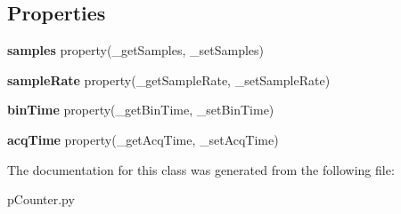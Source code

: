 \subsection*{Properties}
\begin{DoxyCompactItemize}
\item 
\hypertarget{class_chassis_8git_1_1p_counter_1_1_i_bin_p_counter_a27bb742654124efc376a36938b7c3d58}{{\bfseries samples} property(\-\_\-get\-Samples, \-\_\-set\-Samples)}\label{class_chassis_8git_1_1p_counter_1_1_i_bin_p_counter_a27bb742654124efc376a36938b7c3d58}

\item 
\hypertarget{class_chassis_8git_1_1p_counter_1_1_i_bin_p_counter_aff6959435141328d5fbed70595151feb}{{\bfseries sample\-Rate} property(\-\_\-get\-Sample\-Rate, \-\_\-set\-Sample\-Rate)}\label{class_chassis_8git_1_1p_counter_1_1_i_bin_p_counter_aff6959435141328d5fbed70595151feb}

\item 
\hypertarget{class_chassis_8git_1_1p_counter_1_1_i_bin_p_counter_a23219493ee922ae7f91a00314ed6d111}{{\bfseries bin\-Time} property(\-\_\-get\-Bin\-Time, \-\_\-set\-Bin\-Time)}\label{class_chassis_8git_1_1p_counter_1_1_i_bin_p_counter_a23219493ee922ae7f91a00314ed6d111}

\item 
\hypertarget{class_chassis_8git_1_1p_counter_1_1_i_bin_p_counter_a1272a6a5306df8b7f051c8f2867e933c}{{\bfseries acq\-Time} property(\-\_\-get\-Acq\-Time, \-\_\-set\-Acq\-Time)}\label{class_chassis_8git_1_1p_counter_1_1_i_bin_p_counter_a1272a6a5306df8b7f051c8f2867e933c}

\end{DoxyCompactItemize}


The documentation for this class was generated from the following file\-:\begin{DoxyCompactItemize}
\item 
p\-Counter.\-py\end{DoxyCompactItemize}
